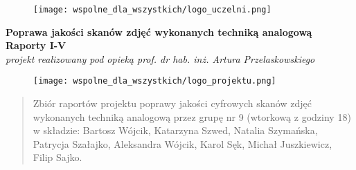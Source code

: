 \documentclass[]{mwart}
\begin{document}
\thispagestyle{empty}

\begin{figure}[h]
    \centering
    \texttt{[image: wspolne\_dla\_wszystkich/logo\_uczelni.png]}
\end{figure}


\begin{center}
    {\LARGE \textbf{Poprawa jakości skanów zdjęć wykonanych techniką analogową
        }} \\[0.3cm]
    {\large \textbf{Raporty I-V}} \\[0.2cm]
    \textit{projekt realizowany pod opieką prof. dr hab. inż. Artura Przelaskowskiego}

\end{center}

\begin{figure}[h]
    \centering
    \texttt{[image: wspolne\_dla\_wszystkich/logo\_projektu.png]}
\end{figure}

\vfill
\begin{abstract}
    Zbiór raportów projektu poprawy jakości cyfrowych skanów zdjęć wykonanych techniką
    analogową przez grupę nr 9 (wtorkową z godziny 18)
    w składzie:  Bartosz Wójcik, Katarzyna Szwed, Natalia Szymańska,
    Patrycja Szałajko, Aleksandra Wójcik, Karol Sęk, Michał Juszkiewicz, Filip Sajko.
\end{abstract}


\newpage
\tableofcontents
\newpage
\end{document}
